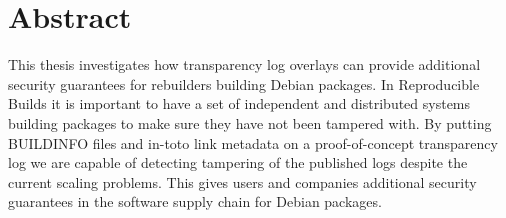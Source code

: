 \documentclass[../Main/thesis.tex]{subfiles}
\begin{document}
\chapter*{Abstract}
This thesis investigates how transparency log overlays can provide additional
security guarantees for rebuilders building Debian packages. In Reproducible
Builds it is important to have a set of independent and distributed systems
building packages to make sure they have not been tampered with. By putting
BUILDINFO files and in-toto link metadata on a proof-of-concept transparency log
we are capable of detecting tampering of the published logs despite the current
scaling problems. This gives users and companies additional security guarantees
in the software supply chain for Debian packages.
\vfill\vfill
\blankpage
\end{document}
